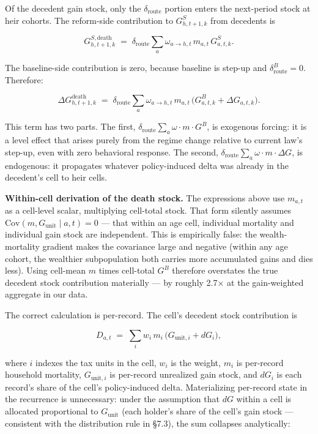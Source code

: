 \documentclass[11pt]{article}
\begin{document}
Of the decedent gain stock, only the $\delta_{\text{route}}$ portion enters the next-period stock at heir cohorts. The reform-side contribution to $G^S_{h, t+1, k}$ from decedents is

\[
G^{S, \text{death}}_{h, t+1, k}
\;=\; \delta_{\text{route}}
\sum_a \omega_{a \to h, t}\,m_{a,t}\,G^S_{a,t,k}.
\]

The baseline-side contribution is zero, because baseline is step-up and $\delta^B_{\text{route}} = 0$. Therefore:

\[
\boxed{
\Delta G^{\text{death}}_{h, t+1, k}
\;=\;
\delta_{\text{route}}
\sum_a \omega_{a \to h, t}\,m_{a,t}\,\big(G^B_{a,t,k} + \Delta G_{a,t,k}\big).
}
\]

This term has two parts. The first, $\delta_{\text{route}} \sum_a \omega \cdot
m \cdot G^B$, is exogenous forcing: it is a level effect that arises purely from the regime change relative to current law's step-up, even with zero behavioral response. The second, $\delta_{\text{route}} \sum_a \omega \cdot
m \cdot \Delta G$, is endogenous: it propagates whatever policy-induced delta was already in the decedent's cell to heir cells.

\textbf{Within-cell derivation of the death stock.} The expressions above use $m_{a,t}$ as a cell-level scalar, multiplying cell-total stock. That form silently assumes $\mathrm{Cov}(m, G_\text{unit} \mid a, t) = 0$ — that within an age cell, individual mortality and individual gain stock are independent. This is empirically false: the wealth-mortality gradient makes the covariance large and negative (within any age cohort, the wealthier subpopulation both carries more accumulated gains and dies less). Using cell-mean $m$ times cell-total $G^B$ therefore overstates the true decedent stock contribution materially — by roughly 2.7× at the gain-weighted aggregate in our data.

The correct calculation is per-record. The cell's decedent stock contribution is

\[
D_{a,t} \;=\; \sum_i w_i\, m_i\, \big(G_{\text{unit},i} + dG_i\big),
\]

where $i$ indexes the tax units in the cell, $w_i$ is the weight, $m_i$ is per-record household mortality, $G_{\text{unit},i}$ is per-record unrealized gain stock, and $dG_i$ is each record's share of the cell's policy-induced delta. Materializing per-record state in the recurrence is unnecessary: under the assumption that $dG$ within a cell is allocated proportional to $G_\text{unit}$ (each holder's share of the cell's gain stock — consistent with the distribution rule in §7.3), the sum collapses analytically:
\end{document}
